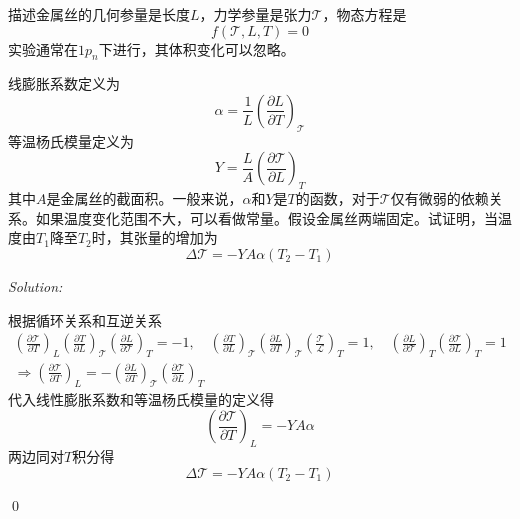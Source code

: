 \documentclass[12pt,a4paper]{article}
\newenvironment{problem}[2][Problem]{\begin{trivlist}
\item[\hskip \labelsep {\bfseries #1}\hskip \labelsep {\bfseries #2.}]}{\end{trivlist}}
\newenvironment{sol}
    {\emph{Solution:}
    }
    {
    \qed
    }
\begin{document}
\begin{problem}{1-5}
描述金属丝的几何参量是长度$L$，力学参量是张力$\mathcal{T}$，物态方程是
\[
f(\mathcal{T},L,T)=0
\]
实验通常在$1p_n$下进行，其体积变化可以忽略。

线膨胀系数定义为
\[
\alpha=\frac{1}{L}\left(\frac{\partial L}{\partial T}\right)_{\mathcal{T}}
\]
等温杨氏模量定义为
\[
Y=\frac{L}{A}\left(\frac{\partial\mathcal{T}}{\partial L}\right)_T
\]
其中$A$是金属丝的截面积。一般来说，$\alpha$和$Y$是$T$的函数，对于$\mathcal{T}$仅有微弱的依赖关系。如果温度变化范围不大，可以看做常量。假设金属丝两端固定。试证明，当温度由$T_1$降至$T_2$时，其张量的增加为
\[
\Delta\mathcal{T}=-YA\alpha(T_2-T_1)
\]
\end{problem}
\begin{sol}
根据循环关系和互逆关系
\begin{gather}
\left(\frac{\partial\mathcal{T}}{\partial T}\right)_L\left(\frac{\partial T}{\partial L}\right)_{\mathcal{T}}\left(\frac{\partial L}{\partial \mathcal{T}}\right)_{T}=-1,\quad\left(\frac{\partial T}{\partial L}\right)_{\mathcal{T}}\left(\frac{\partial L}{\partial T}\right)_{\mathcal{T}}\left(\frac{\mathcal{T}}{\mathcal{L}}\right)_T=1,\quad\left(\frac{\partial L}{\partial\mathcal{T}}\right)_T\left(\frac{\partial\mathcal{T}}{\partial L}\right)_T=1\\
\Longrightarrow\left(\frac{\partial\mathcal{T}}{\partial T}\right)_L=-\left(\frac{\partial L}{\partial T}\right)_{\mathcal{T}}\left(\frac{\partial\mathcal{T}}{\partial L}\right)_T
\end{gather}
代入线性膨胀系数和等温杨氏模量的定义得
\begin{equation}
\left(\frac{\partial\mathcal{T}}{\partial T}\right)_L=-YA\alpha
\end{equation}
两边同对$T$积分得
\begin{equation}
\Delta\mathcal{T}=-YA\alpha(T_2-T_1)
\end{equation}
\end{sol}
\end{document}
